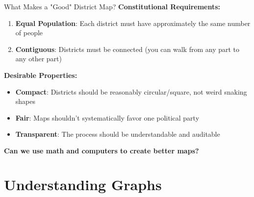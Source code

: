 \documentclass[aspectratio=169]{beamer}
\begin{document}
\begin{frame}{What Makes a "Good" District Map?}
\textbf{Constitutional Requirements:}
\begin{enumerate}
\item \textbf{Equal Population}: Each district must have approximately the same number of people
\item \textbf{Contiguous}: Districts must be connected (you can walk from any part to any other part)
\end{enumerate}

\vspace{1em}
\textbf{Desirable Properties:}
\begin{itemize}
\item \textbf{Compact}: Districts should be reasonably circular/square, not weird snaking shapes
\item \textbf{Fair}: Maps shouldn't systematically favor one political party
\item \textbf{Transparent}: The process should be understandable and auditable
\end{itemize}

\vspace{1em}
\begin{center}
\textbf{Can we use math and computers to create better maps?}
\end{center}
\end{frame}

\section{Understanding Graphs}
\end{document}
